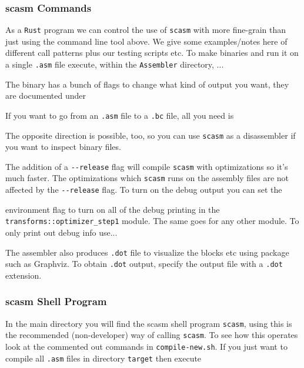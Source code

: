 \subsubsection{scasm Commands}
As a \verb+Rust+ program we can control the use of \verb+scasm+ with more fine-grain than
just using the command line tool above.
We give some examples/notes here of different call patterns plus our testing scripts etc.
To make binaries and run it on a single \verb+.asm+ file execute, within
the \verb+Assembler+ directory, ...


\noindent The binary has a bunch of flags to change what kind of output you want, they are documented under


\noindent If you want to go from an \verb+.asm+ file to a \verb+.bc+ file, all you need is


\noindent The opposite direction is possible, too, so you can use \verb+scasm+ as a disassembler if you want
to inspect binary files.

\noindent The addition of a \verb+--release+ flag will compile \verb+scasm+ with optimizations so it's much faster.
The optimizations which \verb+scasm+ runs on the assembly files are not affected by the \verb+--release+ flag.
To turn on the debug output you can set the


\noindent environment flag to turn on all of the debug printing in the
\verb+transforms::optimizer_step1+ module.  The same goes for any other module.
To only print out debug info use...


\noindent The assembler also produces \verb+.dot+ file to visualize the 
blocks etc using package such as Graphviz. 
To obtain \verb+.dot+ output, specify the output file with a \verb+.dot+ extension.

\subsubsection{scasm Shell Program}
In the main directory you will find the scasm shell program \verb+scasm+,
using this is the recommended (non-developer) way of calling \verb+scasm+.
To see how this operates look at the commented out commands in
\verb+compile-new.sh+.
If you just want to compile all \verb+.asm+ files in directory
\verb+target+ then execute

